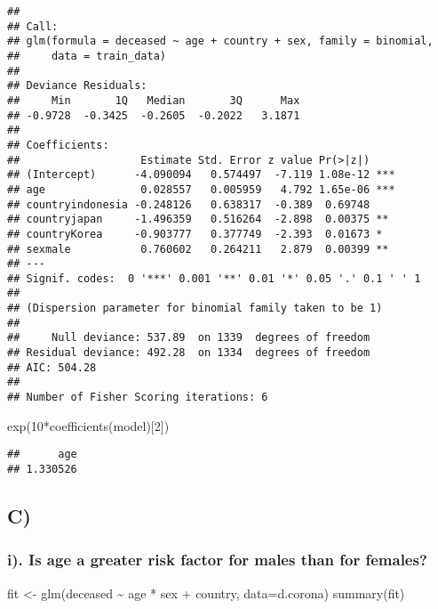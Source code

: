 \documentclass[
]{article}
\newenvironment{Shaded}{\begin{snugshade}}{\end{snugshade}}
\newcommand{\AttributeTok}[1]{\textcolor[rgb]{0.77,0.63,0.00}{#1}}
\newcommand{\DecValTok}[1]{\textcolor[rgb]{0.00,0.00,0.81}{#1}}
\newcommand{\FunctionTok}[1]{\textcolor[rgb]{0.00,0.00,0.00}{#1}}
\newcommand{\NormalTok}[1]{#1}
\newcommand{\OtherTok}[1]{\textcolor[rgb]{0.56,0.35,0.01}{#1}}
\newcommand{\SpecialCharTok}[1]{\textcolor[rgb]{0.00,0.00,0.00}{#1}}
\begin{document}
\begin{verbatim}
## 
## Call:
## glm(formula = deceased ~ age + country + sex, family = binomial, 
##     data = train_data)
## 
## Deviance Residuals: 
##     Min       1Q   Median       3Q      Max  
## -0.9728  -0.3425  -0.2605  -0.2022   3.1871  
## 
## Coefficients:
##                   Estimate Std. Error z value Pr(>|z|)    
## (Intercept)      -4.090094   0.574497  -7.119 1.08e-12 ***
## age               0.028557   0.005959   4.792 1.65e-06 ***
## countryindonesia -0.248126   0.638317  -0.389  0.69748    
## countryjapan     -1.496359   0.516264  -2.898  0.00375 ** 
## countryKorea     -0.903777   0.377749  -2.393  0.01673 *  
## sexmale           0.760602   0.264211   2.879  0.00399 ** 
## ---
## Signif. codes:  0 '***' 0.001 '**' 0.01 '*' 0.05 '.' 0.1 ' ' 1
## 
## (Dispersion parameter for binomial family taken to be 1)
## 
##     Null deviance: 537.89  on 1339  degrees of freedom
## Residual deviance: 492.28  on 1334  degrees of freedom
## AIC: 504.28
## 
## Number of Fisher Scoring iterations: 6
\end{verbatim}

\begin{Shaded}
\begin{Highlighting}[]
\FunctionTok{exp}\NormalTok{(}\DecValTok{10}\SpecialCharTok{*}\FunctionTok{coefficients}\NormalTok{(model)[}\DecValTok{2}\NormalTok{])}
\end{Highlighting}
\end{Shaded}

\begin{verbatim}
##      age 
## 1.330526
\end{verbatim}

\hypertarget{c}{%
\subsection{C)}\label{c}}

\hypertarget{i.-is-age-a-greater-risk-factor-for-males-than-for-females}{%
\subsubsection{i). Is age a greater risk factor for males than for
females?}\label{i.-is-age-a-greater-risk-factor-for-males-than-for-females}}

\begin{Shaded}
\begin{Highlighting}[]
\NormalTok{fit }\OtherTok{\textless{}{-}} \FunctionTok{glm}\NormalTok{(deceased }\SpecialCharTok{\textasciitilde{}}\NormalTok{ age }\SpecialCharTok{*}\NormalTok{ sex }\SpecialCharTok{+}\NormalTok{ country, }\AttributeTok{data=}\NormalTok{d.corona)}
\FunctionTok{summary}\NormalTok{(fit)}
\end{Highlighting}
\end{Shaded}
\end{document}
